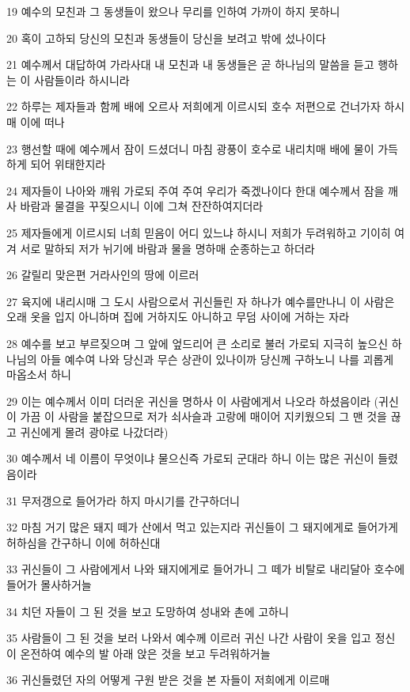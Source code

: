\par 19 예수의 모친과 그 동생들이 왔으나 무리를 인하여 가까이 하지 못하니
\par 20 혹이 고하되 당신의 모친과 동생들이 당신을 보려고 밖에 섰나이다
\par 21 예수께서 대답하여 가라사대 내 모친과 내 동생들은 곧 하나님의 말씀을 듣고 행하는 이 사람들이라 하시니라
\par 22 하루는 제자들과 함께 배에 오르사 저희에게 이르시되 호수 저편으로 건너가자 하시매 이에 떠나
\par 23 행선할 때에 예수께서 잠이 드셨더니 마침 광풍이 호수로 내리치매 배에 물이 가득하게 되어 위태한지라
\par 24 제자들이 나아와 깨워 가로되 주여 주여 우리가 죽겠나이다 한대 예수께서 잠을 깨사 바람과 물결을 꾸짖으시니 이에 그쳐 잔잔하여지더라
\par 25 제자들에게 이르시되 너희 믿음이 어디 있느냐 하시니 저희가 두려워하고 기이히 여겨 서로 말하되 저가 뉘기에 바람과 물을 명하매 순종하는고 하더라
\par 26 갈릴리 맞은편 거라사인의 땅에 이르러
\par 27 육지에 내리시매 그 도시 사람으로서 귀신들린 자 하나가 예수를만나니 이 사람은 오래 옷을 입지 아니하며 집에 거하지도 아니하고 무덤 사이에 거하는 자라
\par 28 예수를 보고 부르짖으며 그 앞에 엎드리어 큰 소리로 불러 가로되 지극히 높으신 하나님의 아들 예수여 나와 당신과 무슨 상관이 있나이까 당신께 구하노니 나를 괴롭게 마옵소서 하니
\par 29 이는 예수께서 이미 더러운 귀신을 명하사 이 사람에게서 나오라 하셨음이라 (귀신이 가끔 이 사람을 붙잡으므로 저가 쇠사슬과 고랑에 매이어 지키웠으되 그 맨 것을 끊고 귀신에게 몰려 광야로 나갔더라)
\par 30 예수께서 네 이름이 무엇이냐 물으신즉 가로되 군대라 하니 이는 많은 귀신이 들렸음이라
\par 31 무저갱으로 들어가라 하지 마시기를 간구하더니
\par 32 마침 거기 많은 돼지 떼가 산에서 먹고 있는지라 귀신들이 그 돼지에게로 들어가게 허하심을 간구하니 이에 허하신대
\par 33 귀신들이 그 사람에게서 나와 돼지에게로 들어가니 그 떼가 비탈로 내리달아 호수에 들어가 몰사하거늘
\par 34 치던 자들이 그 된 것을 보고 도망하여 성내와 촌에 고하니
\par 35 사람들이 그 된 것을 보러 나와서 예수께 이르러 귀신 나간 사람이 옷을 입고 정신이 온전하여 예수의 발 아래 앉은 것을 보고 두려워하거늘
\par 36 귀신들렸던 자의 어떻게 구원 받은 것을 본 자들이 저희에게 이르매

